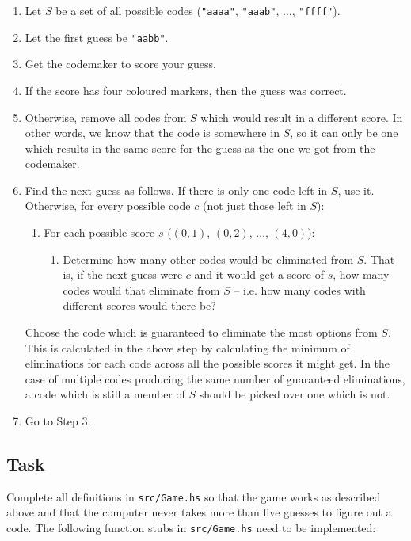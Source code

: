 \documentclass{cs256-shared/cs256}
\begin{document}
\begin{enumerate}
    \item Let $S$ be a set of all possible codes (\texttt{"aaaa"}, \texttt{"aaab"}, $\ldots$, \texttt{"ffff"}).
    \item Let the first guess be \texttt{"aabb"}.
    \item Get the codemaker to score your guess.
    \item If the score has four coloured markers, then the guess was correct.
    \item Otherwise, remove all codes from $S$ which would result in a different score. In other words, we know that the code is somewhere in $S$, so it can only be one which results in the same score for the guess as the one we got from the codemaker. 
    \item Find the next guess as follows. If there is only one code left in $S$, use it. Otherwise, for every possible code $c$ (not just those left in $S$):
    \begin{enumerate}
        \item For each possible score $s$ ($(0,1)$, $(0,2)$, $\ldots$, $(4,0)$):
        \begin{enumerate}
            \item Determine how many other codes would be eliminated from $S$. That is, if the next guess were $c$ and it would get a score of $s$, how many codes would that eliminate from $S$ -- i.e. how many codes with different scores would there be?
        \end{enumerate}
    \end{enumerate}
    Choose the code which is guaranteed to eliminate the most options from $S$. This is calculated in the above step by calculating the minimum of eliminations for each code across all the possible scores it might get.
    In the case of multiple codes producing the same number of guaranteed eliminations, a code which is still a member of $S$ should be picked over one which is not.
    \item Go to Step 3.
\end{enumerate}


\subsection*{Task}

Complete all definitions in \texttt{src/Game.hs} so that the game works as described above and that the computer never takes more than five guesses to figure out a code. The following function stubs in \texttt{src/Game.hs}  need to be implemented:
\end{document}

